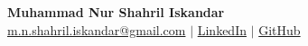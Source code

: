 \documentclass[../main.tex]{subfiles}
\begin{document}
\begin{center}
    \textbf{\fontsize{14}{14}\selectfont Muhammad Nur Shahril Iskandar} \\ \vspace{3pt}
    \small
    \faEnvelope \hspace{.5pt} \href{mailto:}{m.n.shahril.iskandar@gmail.com}
    $|$
    \faLinkedin \hspace{.5pt} \href{https://www.linkedin.com/in/shahril-iskandar}{LinkedIn}
    $|$
    \faGithub \hspace{.5pt} \href{https://github.com/Shahril-Iskandar}{GitHub}
\end{center}
\end{document}
